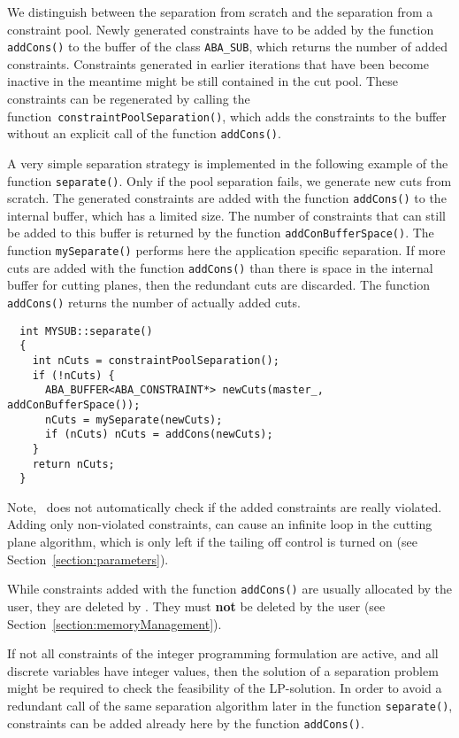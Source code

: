 We distinguish between the
separation from scratch and the separation from a constraint pool.
Newly generated constraints
have to be added by the 
function {\tt addCons()} to the
buffer of the class {\tt ABA\_SUB}, which returns the number
of added constraints.
Constraints generated in earlier iterations that have been become
inactive in the meantime might be still contained in the cut pool.
These constraints can be regenerated by calling the 
function~{\tt constraintPoolSeparation()}, 
which adds the constraints to the buffer without
an explicit call of the function {\tt addCons()}.

A very simple separation strategy is implemented in the following example
of the function {\tt separate()}. Only if the pool separation fails, we
generate new cuts from scratch. The generated constraints are 
added with the function {\tt addCons()}
to the internal buffer, which has a limited size. The number
of constraints that can still be added to this buffer is returned
by the function {\tt addConBufferSpace()}. 
The function {\tt mySeparate()} performs here the application specific 
separation. If more cuts are added with the function {\tt addCons()}
than there is space in the internal buffer for cutting planes, then
the redundant cuts are discarded. The function {\tt addCons()} returns
the number of actually added cuts.
\begin{verbatim}
  int MYSUB::separate()
  {
    int nCuts = constraintPoolSeparation();
    if (!nCuts) {
      ABA_BUFFER<ABA_CONSTRAINT*> newCuts(master_, addConBufferSpace());
      nCuts = mySeparate(newCuts);
      if (nCuts) nCuts = addCons(newCuts);
    }
    return nCuts;
  }
\end{verbatim}
Note, \ABACUS\ does not automatically check if the added constraints are really
violated. Adding only non-violated constraints, can cause an infinite
loop in the cutting plane algorithm, which is only left if the tailing
off control is turned on (see Section~\ref{section:parameters}).

While constraints added with the function {\tt addCons()} are usually
allocated by the user, they are deleted by \ABACUS. They must {\bf
  not} be deleted by the user (see Section~\ref{section:memoryManagement}).

If not all constraints of the integer programming formulation are active,
and all discrete variables have integer values,
then the solution of a separation problem might be required to check
the feasibility of the LP-solution. In order to avoid a redundant call
of the same separation algorithm later in the function {\tt separate()},
constraints can be added already here by the function {\tt addCons()}.

